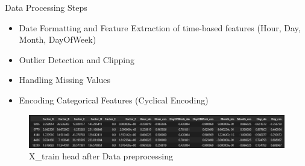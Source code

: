 \documentclass{beamer}
\begin{document}
\begin{frame}{Data Processing Steps}
\begin{itemize}
    \item Date Formatting and Feature Extraction of time-based features (Hour, Day, Month, DayOfWeek)
    \item Outlier Detection and Clipping
    \item Handling Missing Values
    \item Encoding Categorical Features (Cyclical Encoding)
\end{itemize}
\begin{figure}
    \centering
    \includegraphics[width=0.9\linewidth]{images/Xtrain_head.png}
    \caption{X\_train head after Data preprocessing}
    \label{fig:enter-label}
\end{figure}
\end{frame}
\end{document}
